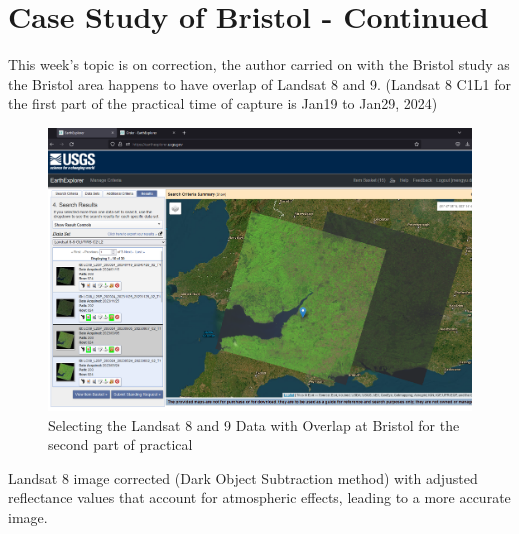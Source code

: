 \documentclass[
  letterpaper,
  DIV=11,
  numbers=noendperiod]{scrreprt}
\begin{document}
\hypertarget{case-study-of-bristol---continued}{%
\section*{Case Study of Bristol -
Continued}\label{case-study-of-bristol---continued}}


This week's topic is on correction, the author carried on with the
Bristol study as the Bristol area happens to have overlap of Landsat 8
and 9. (Landsat 8 C1L1 for the first part of the practical time of
capture is Jan19 to Jan29, 2024)

\begin{figure}

{\centering \includegraphics[width=6.23958in,height=\textheight]{images/wk3/Screenshot 2024-02-17 173551.png}

}

\caption{Selecting the Landsat 8 and 9 Data with Overlap at Bristol for
the second part of practical}

\end{figure}

Landsat 8 image corrected (Dark Object Subtraction method) with adjusted
reflectance values that account for atmospheric effects, leading to a
more accurate image.
\end{document}

